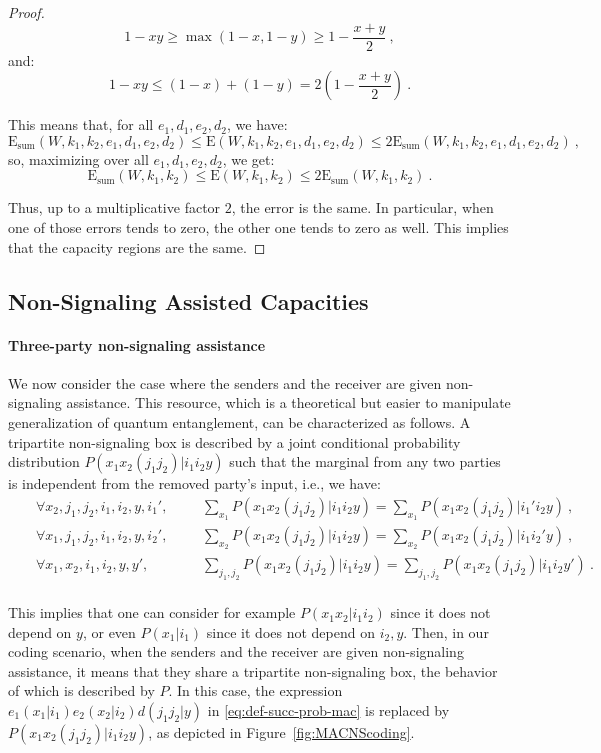 \documentclass[11pt]{article}
\theoremstyle{definition}
\theoremstyle{remark}
\begin{document}
\begin{proof}
\[1-xy \geq \max\left(1-x,1-y\right) \geq 1-\frac{x+y}{2} \ , \]
and:
\[1-xy \leq (1-x) + (1-y) = 2  \left(1-\frac{x+y}{2}\right) \ . \]

This means that, for all $e_1,d_1,e_2,d_2$, we have:
\[ \mathrm{E}_{\text{sum}}(W,k_1,k_2,e_1,d_1,e_2,d_2) \leq \mathrm{E}(W,k_1,k_2,e_1,d_1,e_2,d_2) \leq 2\mathrm{E}_{\text{sum}}(W,k_1,k_2,e_1,d_1,e_2,d_2) \ ,\]
so, maximizing over all $e_1,d_1,e_2,d_2$, we get:
\[ \mathrm{E}_{\text{sum}}(W,k_1,k_2) \leq \mathrm{E}(W,k_1,k_2) \leq 2\mathrm{E}_{\text{sum}}(W,k_1,k_2) \ .\]

Thus, up to a multiplicative factor $2$, the error is the same. In particular, when one of those errors tends to zero, the other one tends to zero as well. This implies that the capacity regions are the same.
\end{proof}

\subsection{Non-Signaling Assisted Capacities}
\paragraph{Three-party non-signaling assistance} We now consider the case where the senders and the receiver are given non-signaling assistance. This resource, which is a theoretical but easier to manipulate generalization of quantum entanglement, can be characterized as follows. A tripartite non-signaling box is described by a joint conditional probability distribution $P(x_1x_2(j_1j_2)|i_1i_2y)$ such that the marginal from any two parties is independent from the removed party's input, i.e., we have:
\begin{equation}
  \begin{aligned}
    &&\forall x_2,j_1,j_2,i_1,i_2,y,i_1', &&&\sum_{x_1} P(x_1x_2(j_1j_2)|i_1i_2y) = \sum_{x_1} P(x_1x_2(j_1j_2)|i_1'i_2y) \ ,\\
    &&\forall x_1,j_1,j_2,i_1,i_2,y,i_2', &&&\sum_{x_2} P(x_1x_2(j_1j_2)|i_1i_2y) = \sum_{x_2} P(x_1x_2(j_1j_2)|i_1i_2'y) \ ,\\
    &&\forall x_1,x_2,i_1,i_2,y,y', &&&\sum_{j_1,j_2} P(x_1x_2(j_1j_2)|i_1i_2y) = \sum_{j_1,j_2} P(x_1x_2(j_1j_2)|i_1i_2y') \ .\\
  \end{aligned}
\end{equation}

This implies that one can consider for example $P(x_1x_2|i_1i_2)$ since it does not depend on $y$, or even $P(x_1|i_1)$ since it does not depend on $i_2,y$. Then, in our coding scenario, when the senders and the receiver are given non-signaling assistance, it means that they share a tripartite non-signaling box, the behavior of which is described by $P$. In this case, the expression $e_1(x_1|i_1)e_2(x_2|i_2)d(j_1j_2|y)$ in \eqref{eq:def-succ-prob-mac} is replaced by $P(x_1x_2(j_1j_2)|i_1i_2y)$, as depicted in Figure~\ref{fig:MACNScoding}.
\end{document}
